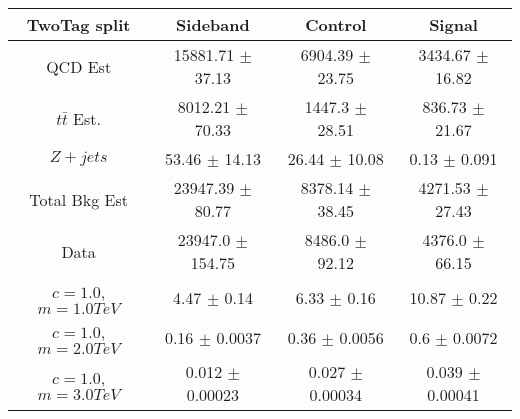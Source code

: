 \begin{footnotesize} 
\begin{tabular}{c|c|c|c} 
TwoTag split & Sideband & Control & Signal \\ 
\hline\hline 
QCD Est & 15881.71 $\pm$ 37.13 & 6904.39 $\pm$ 23.75 & 3434.67 $\pm$ 16.82\\ 
$t\bar{t}$ Est.  & 8012.21 $\pm$ 70.33 & 1447.3 $\pm$ 28.51 & 836.73 $\pm$ 21.67\\ 
$Z+jets$ & 53.46 $\pm$ 14.13 & 26.44 $\pm$ 10.08 & 0.13 $\pm$ 0.091\\ 
Total Bkg Est & 23947.39 $\pm$ 80.77 & 8378.14 $\pm$ 38.45 & 4271.53 $\pm$ 27.43\\ 
Data & 23947.0 $\pm$ 154.75 & 8486.0 $\pm$ 92.12 & 4376.0 $\pm$ 66.15\\ 
$c=1.0$,$m=1.0TeV$ & 4.47 $\pm$ 0.14 & 6.33 $\pm$ 0.16 & 10.87 $\pm$ 0.22\\ 
$c=1.0$,$m=2.0TeV$ & 0.16 $\pm$ 0.0037 & 0.36 $\pm$ 0.0056 & 0.6 $\pm$ 0.0072\\ 
$c=1.0$,$m=3.0TeV$ & 0.012 $\pm$ 0.00023 & 0.027 $\pm$ 0.00034 & 0.039 $\pm$ 0.00041\\ 
\hline\hline 
\end{tabular} 
\end{footnotesize} 
\newline 
